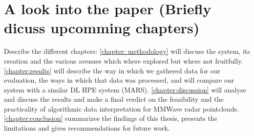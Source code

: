 \section{A look into the paper (Briefly dicuss upcomming chapters)}
\label{section: introduction - a look into the paper}

Describe the different chapters: 
\cref{chapter: methodology} will discuss the system, its creation and the various avenues which where explored but where not fruitfully. 
\cref{chapter:results} will describe the way in which we gathered data for our evaluation, the ways in which that data was processed, and will compare our system with a similar DL HPE system (MARS).
\cref{chapter:discussion} will analyse and discuss the results and make a final verdict on the feasibility and the practicality of algorithmic data interpretation for MMWave radar pointclouds.
\cref{chapter:conclusion} summarizes the findings of this thesis, presents the limitations and gives recommendations for future work.


